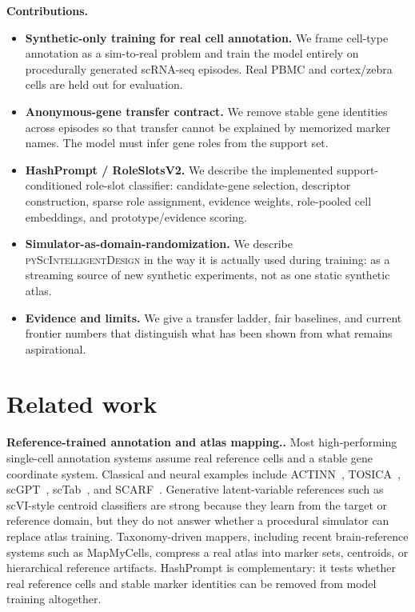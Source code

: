 \documentclass{article}
\newcommand{\myparagraph}[1]{\noindent\textbf{#1.} }
\begin{document}
\myparagraph{Contributions}
\begin{itemize}
    \item \textbf{Synthetic-only training for real cell annotation.} We frame cell-type annotation as a sim-to-real problem and train the model entirely on procedurally generated scRNA-seq episodes. Real PBMC and cortex/zebra cells are held out for evaluation.
    \item \textbf{Anonymous-gene transfer contract.} We remove stable gene identities across episodes so that transfer cannot be explained by memorized marker names. The model must infer gene roles from the support set.
    \item \textbf{HashPrompt / RoleSlotsV2.} We describe the implemented support-conditioned role-slot classifier: candidate-gene selection, descriptor construction, sparse role assignment, evidence weights, role-pooled cell embeddings, and prototype/evidence scoring.
    \item \textbf{Simulator-as-domain-randomization.} We describe \textsc{pyScIntelligentDesign} in the way it is actually used during training: as a streaming source of new synthetic experiments, not as one static synthetic atlas.
    \item \textbf{Evidence and limits.} We give a transfer ladder, fair baselines, and current frontier numbers that distinguish what has been shown from what remains aspirational.
\end{itemize}

\section{Related work}

\myparagraph{Reference-trained annotation and atlas mapping.}
Most high-performing single-cell annotation systems assume real reference cells and a stable gene coordinate system. Classical and neural examples include ACTINN~\cite{ma2020actinn}, TOSICA~\cite{chen2023transformer}, scGPT~\cite{cui2024scgpt}, scTab~\cite{fischer2024sctab}, and SCARF~\cite{liu2025scarf}. Generative latent-variable references such as scVI-style centroid classifiers are strong because they learn from the target or reference domain, but they do not answer whether a procedural simulator can replace atlas training. Taxonomy-driven mappers, including recent brain-reference systems such as MapMyCells, compress a real atlas into marker sets, centroids, or hierarchical reference artifacts. HashPrompt is complementary: it tests whether real reference cells and stable marker identities can be removed from model training altogether.
\end{document}
